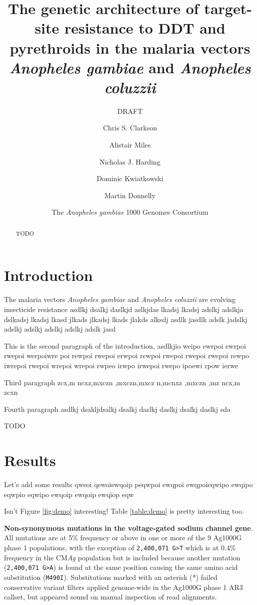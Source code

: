 \documentclass[a4paper,10pt,abstracton]{scrartcl}
\title{The genetic architecture of target-site resistance to DDT and
  pyrethroids in the malaria vectors \emph{Anopheles gambiae} and
  \emph{Anopheles coluzzii}}
\subtitle{DRAFT}
\author[1]{Chris S. Clarkson}
\author[2,1]{Alistair Miles}
\author[2]{Nicholas J. Harding}
\author[1,2]{Dominic Kwiatkowski}
\author[3,1]{Martin Donnelly}
\author[4]{The \emph{Anopheles gambiae} 1000 Genomes Consortium}
\affil[1]{Sanger @@TODO}
\affil[2]{Oxford @@TODO}
\affil[3]{Liverpool @@TODO}
\affil[4]{MalariaGEN @@TODO}
\begin{document}
\maketitle

\begin{abstract}

TODO

\end{abstract}

\section*{Introduction}

The malaria vectors \emph{Anopheles gambiae} and \emph{Anopheles
  coluzzii} are evolving insecticide resistance asdlkj dsalkj daslkjd
aslkjdas lkadsj lkadsj adslkj adslkja dslkadsj lkadsj lkasd jlkads
jlkadsj lkads jlakds alksdj asdlk jasdlk adslk jadslkj adslkj adslkj
adslkj adslkj adslk jasd

This is the second paragraph of the introduction, asdlkjio weipo
ewrpoi ewrpoi rwepoi werpoiwre poi rewpoi rwepoi erwpoi rewpoi rwepoi
rwepoi rwepoi rewpo iwrepoi rwepoi wrepoi wrepoi rwpeo irwpo irwepoi
rwepo ipoewi rpow ierwe

Third paragraph zcx,m ncxz,mxczn ,mxczn,mxcz n,mcnxz ,mxczn ,mz ncx,m
zcxn

Fourth paragraph asdlkj dsakljdsalkj dsalkj daslkj daslkj dsalkj
daslkj sda \cite{Garud2015}

TODO

\section*{Results}

Let's add some results qweoi qewoiewqoip peqwpoi ewqpoi ewqpoieqwipo
ewqipo eqwpio eqwipo ewqoip ewqoip ewqiop eqw

Isn't Figure \ref{fig:demo} interesting! Table \ref{table:demo} is
pretty interesting too.

\begin{landscape}
\begin{table}[h]
  \small
  \centering
  
  \caption{\textbf{Non-synonymous mutations in the voltage-gated
      sodium channel gene}. All mutations are at 5\% frequency or
    above in one or more of the 9 Ag1000G phase 1 populations, with
    the exception of \texttt{2,400,071 G>T} which is at 0.4\%
    frequency in the CM\emph{Ag} population but is included because
    another mutation (\texttt{2,400,071 G>A}) is found at the same
    position causing the same amino acid substitution
    (\texttt{M490I}). Substitutions marked with an asterisk (*) failed
    conservative variant filters applied genome-wide in the Ag1000G
    phase 1 AR3 callset, but appeared sound on manual inspection of
    read alignments.}
  \label{table:variants_missense}
\end{table}
\end{landscape}
\end{document}
